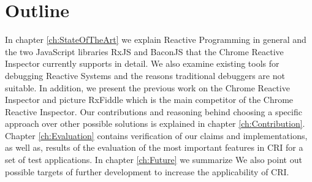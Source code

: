 \section{Outline}
In chapter \ref{ch:StateOfTheArt} we explain Reactive Programming in general and the two JavaScript libraries RxJS and BaconJS that the Chrome Reactive Inspector currently supports in detail. We also examine existing tools for debugging Reactive Systems and the reasons traditional debuggers are not suitable. In addition, we present the previous work on the Chrome Reactive Inspector and picture RxFiddle which is the main competitor of the Chrome Reactive Inspector.
Our contributions and reasoning behind choosing a specific approach over other possible solutions is explained in chapter \ref{ch:Contribution}.
Chapter \ref{ch:Evaluation} contains verification of our claims and implementations, as well as, results of the evaluation of the most important features in CRI for a set of test applications.
In chapter \ref{ch:Future} we summarize  We also point out possible targets of further development to increase the applicability of CRI.
